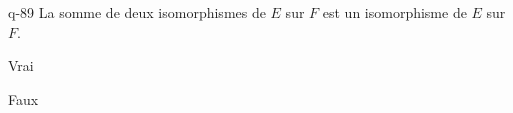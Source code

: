 \begin{truefalse}{q-89}
La somme de deux isomorphismes de $E$ sur $F$ est un isomorphisme de $E$ sur $F$.
\item Vrai
\item* Faux
\end{truefalse}

